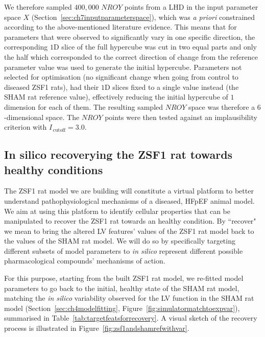 \vspace{0.2cm}
We therefore sampled $400,000$ $NROY$ points from a LHD in the input parameter space $X$ (Section~\ref{sec:ch7inputparameterspace}), which was \textit{a priori} constrained according to the above-mentioned literature evidence. This means that for parameters that were observed to significantly vary in one specific direction, the corresponding $1$D slice of the full hypercube was cut in two equal parts and only the half which corresponded to the correct direction of change from the reference parameter value was used to generate the initial hypercube. Parameters not selected for optimisation (no significant change when going from control to diseased ZSF1 rats), had their $1$D slices fixed to a single value instead (the SHAM rat reference value), effectively reducing the initial hypercube of $1$ dimension for each of them. The resulting sampled $NROY$ space was therefore a $6$-dimensional space. The $NROY$ points were then tested against an implausibility criterion with $I_{\,\textrm{cutoff}}=3.0$.


%
%
%
\subsection{In silico recoverying the ZSF1 rat towards healthy conditions}\label{sec:ch7insilicorecoveryingmethods}
The ZSF1 rat model we are building will constitute a virtual platform to better understand pathophysiological mechanisms of a diseased, HFpEF animal model. We aim at using this platform to identify cellular properties that can be manipulated to recover the ZSF1 rat towards an healthy condition. By ``recover" we mean to bring the altered LV features' values of the ZSF1 rat model back to the values of the SHAM rat model. We will do so by specifically targeting different subsets of model parameters to \textit{in silico} represent different possible pharmacological compounds' mechanisms of action.

\vspace{0.2cm}
For this purpose, starting from the built ZSF1 rat model, we re-fitted model parameters to go back to the initial, healthy state of the SHAM rat model, matching the \textit{in silico} variability observed for the LV function in the SHAM rat model (Section~\ref{sec:ch4modelfitting}, Figure~\ref{fig:simulatormatchtoexpvar}), summarised in Table~\ref{tab:targetfeatsforrecovery}. A visual sketch of the recovery process is illustrated in Figure~\ref{fig:zsf1andshamrefwithvar}.

